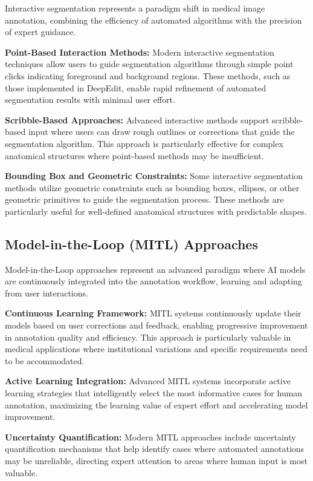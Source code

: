 Interactive segmentation represents a paradigm shift in medical image annotation, combining the efficiency of automated algorithms with the precision of expert guidance.

\textbf{Point-Based Interaction Methods:} Modern interactive segmentation techniques allow users to guide segmentation algorithms through simple point clicks indicating foreground and background regions. These methods, such as those implemented in DeepEdit, enable rapid refinement of automated segmentation results with minimal user effort.

\textbf{Scribble-Based Approaches:} Advanced interactive methods support scribble-based input where users can draw rough outlines or corrections that guide the segmentation algorithm. This approach is particularly effective for complex anatomical structures where point-based methods may be insufficient.

\textbf{Bounding Box and Geometric Constraints:} Some interactive segmentation methods utilize geometric constraints such as bounding boxes, ellipses, or other geometric primitives to guide the segmentation process. These methods are particularly useful for well-defined anatomical structures with predictable shapes.

\subsection{Model-in-the-Loop (MITL) Approaches}

Model-in-the-Loop approaches represent an advanced paradigm where AI models are continuously integrated into the annotation workflow, learning and adapting from user interactions.

\textbf{Continuous Learning Framework:} MITL systems continuously update their models based on user corrections and feedback, enabling progressive improvement in annotation quality and efficiency. This approach is particularly valuable in medical applications where institutional variations and specific requirements need to be accommodated.

\textbf{Active Learning Integration:} Advanced MITL systems incorporate active learning strategies that intelligently select the most informative cases for human annotation, maximizing the learning value of expert effort and accelerating model improvement.

\textbf{Uncertainty Quantification:} Modern MITL approaches include uncertainty quantification mechanisms that help identify cases where automated annotations may be unreliable, directing expert attention to areas where human input is most valuable.


